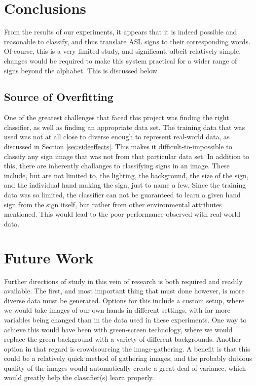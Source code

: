 \documentclass[10pt,Times New Roman]{article}
\begin{document}
\section{Conclusions}
From the results of our experiments, it appears that it is indeed possible and reasonable to
classify, and thus translate ASL signs to their corresponding words. Of course, this is a very
limited study, and significant, albeit relatively simple, changes would be required to make
this system practical for a wider range of signs beyond the alphabet. This is discussed below.
    
    \subsection{Source of Overfitting}
        One of the greatest challenges that faced this project was finding the right classifier,
        as well as finding an appropriate data set. The training data that was used was not at all
        close to diverse enough to represent real-world data, as discussed in Section 
        \ref{sec:sideeffects}. This makes it difficult-to-impossible to classify any sign image that
        was not from that particular data set. In addition to this, there are inherently challanges
        to classifying signs in an image. These include, but are not limited to, the lighting, the
        background, the size of the sign, and the individual hand making the sign, just to name a
        few. Since the training data was so limited, the classifier can not be guaranteed to
        learn a given hand sign from the sign itself, but rather from other environmental
        attributes mentioned. This would lead to the poor performance observed with real-world
        data.

\section{Future Work}
Further directions of study in this vein of research is both required and readily available. 
The first, and most important thing that must done however, is more diverse data must be generated.
Options for this include a custom setup, where we would take images of our own hands in different
settings, with far more variables being changed than in the data used in these experiments. One 
way to achieve this would have been with green-screen technology, where we would replace the green
background with a variety of different backgrounds. Another
option in that regard is crowdsourcing the image-gathering. A benefit is that this could be a 
relatively quick method of gathering images, and the probably dubious quality of the images would
automatically create a great deal of variance, which would greatly help the classifier(s) learn 
properly.
\end{document}
